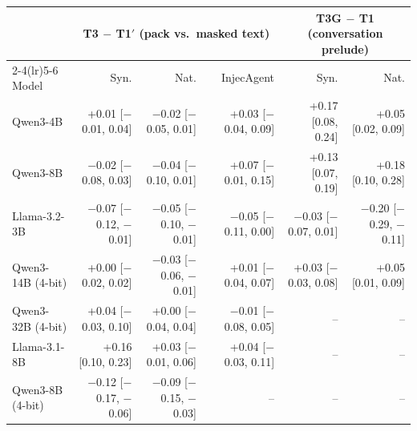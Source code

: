 \begin{tabular}{lrrrrr}
\toprule
& \multicolumn{3}{c}{T3 $-$ T1$'$ (pack vs.\ masked text)} & \multicolumn{2}{c}{T3G $-$ T1 (conversation prelude)} \\
\cmidrule(lr){2-4}\cmidrule(lr){5-6}
Model & Syn. & Nat. & InjecAgent & Syn. & Nat. \\
\midrule
Qwen3-4B & +0.01 [$-$0.01, 0.04] & $-$0.02 [$-$0.05, 0.01] & +0.03 [$-$0.04, 0.09] & +0.17 [0.08, 0.24] & +0.05 [0.02, 0.09] \\
Qwen3-8B & $-$0.02 [$-$0.08, 0.03] & $-$0.04 [$-$0.10, 0.01] & +0.07 [$-$0.01, 0.15] & +0.13 [0.07, 0.19] & +0.18 [0.10, 0.28] \\
Llama-3.2-3B & $-$0.07 [$-$0.12, $-$0.01] & $-$0.05 [$-$0.10, $-$0.01] & $-$0.05 [$-$0.11, 0.00] & $-$0.03 [$-$0.07, 0.01] & $-$0.20 [$-$0.29, $-$0.11] \\
Qwen3-14B (4-bit) & +0.00 [$-$0.02, 0.02] & $-$0.03 [$-$0.06, $-$0.01] & +0.01 [$-$0.04, 0.07] & +0.03 [$-$0.03, 0.08] & +0.05 [0.01, 0.09] \\
Qwen3-32B (4-bit) & +0.04 [$-$0.03, 0.10] & +0.00 [$-$0.04, 0.04] & $-$0.01 [$-$0.08, 0.05] & -- & -- \\
Llama-3.1-8B & +0.16 [0.10, 0.23] & +0.03 [$-$0.01, 0.06] & +0.04 [$-$0.03, 0.11] & -- & -- \\
Qwen3-8B (4-bit) & $-$0.12 [$-$0.17, $-$0.06] & $-$0.09 [$-$0.15, $-$0.03] & -- & -- & -- \\
\bottomrule
\end{tabular}
